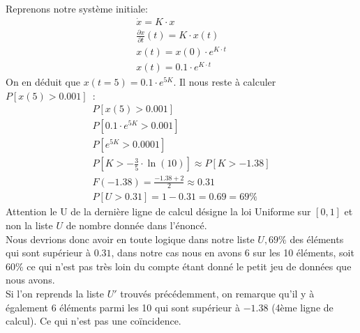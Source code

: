 \documentclass[11pt,a4paper]{report}
\begin{document}
			Reprenons notre système initiale:
			\begin{gather*}
					\dot{x} = K \cdot x\\
					\frac{\partial x}{\partial t} (t) = K \cdot x(t)\\
					x(t) = x(0) \cdot e^{K \cdot t}\\
					x(t) = 0.1 \cdot e^{K \cdot t}
			\end{gather*}
			On en déduit que $x(t=5) = 0.1 \cdot e^{5K} $. Il nous reste à calculer $P\left[x(5) > 0.001\right]$~:
			\begin{gather*}
					P\left[x(5) > 0.001\right]\\
					P\left[0.1 \cdot e^{5K} > 0.001\right]\\
					P\left[e^{5K} > 0.0001\right]\\
					P\left[K > -\frac{3}{5} \cdot \ln(10)\right] \approx P\left[K > -1.38\right]	\\
					F(-1.38) = 	\frac{-1.38 + 2}{2} \approx 0.31\\
					P\left[U > 0.31 \right] = 1-0.31 = 0.69 =69\%
			\end{gather*}
			Attention le U de la dernière ligne de calcul désigne la loi Uniforme sur $[0, 1]$ et non la liste $U$ de nombre donnée dans l'énoncé.\\

			Nous devrions donc avoir en toute logique dans notre liste $U, 69\%$ des éléments qui sont supérieur à $0.31$, dans notre cas nous en avons 6 sur les 10 éléments, soit $60\%$ ce qui n'est pas très loin du compte étant donné le petit jeu de données que nous avons.\\
			Si l'on reprends la liste $U'$ trouvés précédemment, on remarque qu'il y à également 6 éléments parmi les 10 qui sont supérieur à $-1.38$ (4ème ligne de calcul). Ce qui n'est pas une coïncidence.
\end{document}
